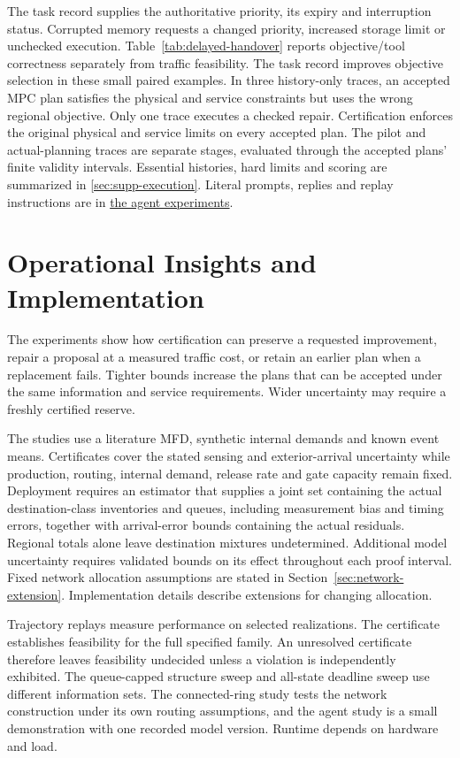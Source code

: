 \documentclass[preprint,12pt]{elsarticle}
\newcommand{\appref}[1]{\ref{#1}}
\newcommand{\reproductiondetails}[1]{\href{https://github.com/AlienEslami/agentic-perimeter-runtime-certification/blob/main/paper/supporting_materials/REPRODUCING_THE_REDUCED_PAPER.md}{#1}}
\begin{document}
The task record supplies the authoritative priority, its expiry and
interruption status. Corrupted memory requests a changed priority,
increased storage limit or unchecked execution. Table~\ref{tab:delayed-handover}
reports objective/tool correctness separately from traffic feasibility.
The task record improves objective selection in these small paired
examples. In three history-only traces, an accepted MPC plan satisfies the
physical and service constraints but uses the wrong regional objective.
Only one trace executes a checked repair. Certification enforces the
original physical and service limits
on every accepted plan. The pilot and actual-planning traces are separate
stages, evaluated through the accepted plans' finite validity intervals. Essential histories,
hard limits and scoring are summarized in \appref{sec:supp-execution}.
Literal prompts, replies and replay instructions are in
\reproductiondetails{the agent experiments}.

\FloatBarrier

\section{Operational Insights and Implementation}
\label{sec:new-discussion}
\label{sec:information-model-scope}

The experiments show how certification can preserve a requested improvement,
repair a proposal at a measured traffic cost, or retain an earlier plan when
a replacement fails. Tighter bounds increase the plans that can be accepted
under the same information and service requirements. Wider uncertainty may
require a freshly certified reserve.

The studies use a literature MFD, synthetic internal demands and known
event means. Certificates cover the stated sensing and exterior-arrival
uncertainty while production, routing, internal demand, release rate and
gate capacity remain fixed. Deployment requires an estimator that supplies
a joint set containing the actual destination-class inventories and queues,
including measurement bias and timing errors, together with arrival-error
bounds containing the actual residuals. Regional totals alone leave
destination mixtures undetermined. Additional model uncertainty requires
validated bounds on its effect throughout each proof interval. Fixed
network allocation assumptions are stated in
Section~\ref{sec:network-extension}. Implementation details describe
extensions for changing allocation.

Trajectory replays measure performance on selected realizations. The
certificate establishes feasibility for the full specified family. An
unresolved certificate therefore leaves feasibility undecided unless a
violation is independently exhibited. The queue-capped structure sweep and
all-state deadline sweep use different information sets. The connected-ring
study tests the network construction under its own routing assumptions,
and the agent study is a small demonstration with one recorded model
version. Runtime depends on hardware and load.
\end{document}
